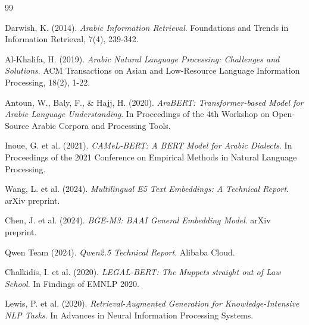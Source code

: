 \documentclass[12pt,a4paper]{report}
\begin{document}
\clearpage
{
    \hypersetup{linkcolor=PrimaryBlue}
    \tableofcontents
}
\clearpage
{}
\listoftables

\clearpage
{}
\listoffigures
\clearpage
\clearpage










\begin{thebibliography}{99}

 Darwish, K. (2014). \textit{Arabic Information Retrieval}. Foundations and Trends in Information Retrieval, 7(4), 239-342.

 Al-Khalifa, H. (2019). \textit{Arabic Natural Language Processing: Challenges and Solutions}. ACM Transactions on Asian and Low-Resource Language Information Processing, 18(2), 1-22.

 Antoun, W., Baly, F., \& Hajj, H. (2020). \textit{AraBERT: Transformer-based Model for Arabic Language Understanding}. In Proceedings of the 4th Workshop on Open-Source Arabic Corpora and Processing Tools.

 Inoue, G. et al. (2021). \textit{CAMeL-BERT: A BERT Model for Arabic Dialects}. In Proceedings of the 2021 Conference on Empirical Methods in Natural Language Processing.

 Wang, L. et al. (2024). \textit{Multilingual E5 Text Embeddings: A Technical Report}. arXiv preprint.

 Chen, J. et al. (2024). \textit{BGE-M3: BAAI General Embedding Model}. arXiv preprint.

 Qwen Team (2024). \textit{Qwen2.5 Technical Report}. Alibaba Cloud.

 Chalkidis, I. et al. (2020). \textit{LEGAL-BERT: The Muppets straight out of Law School}. In Findings of EMNLP 2020.

 Lewis, P. et al. (2020). \textit{Retrieval-Augmented Generation for Knowledge-Intensive NLP Tasks}. In Advances in Neural Information Processing Systems.


\end{thebibliography}
\end{document}
